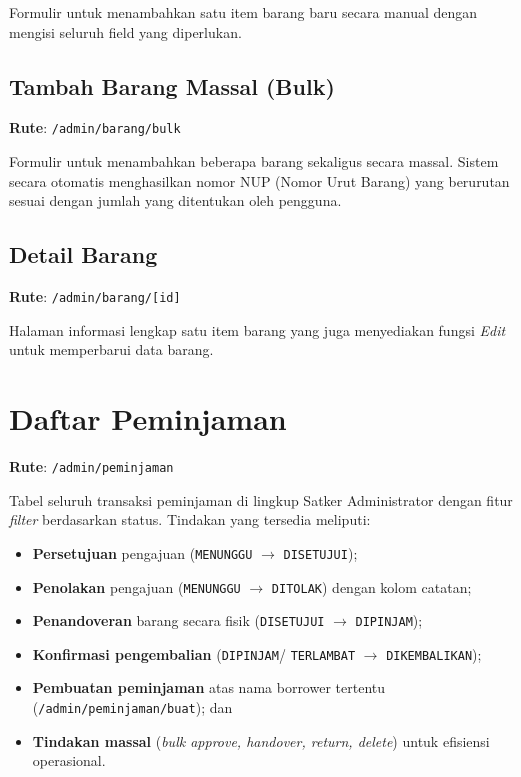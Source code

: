 \documentclass[
  12pt,
  a4paper,
  oneside,
  final
]{report}
\begin{document}
Formulir untuk menambahkan satu item barang baru secara manual
dengan mengisi seluruh field yang diperlukan.

\subsection{Tambah Barang Massal (Bulk)}
\textbf{Rute}: \texttt{/admin/barang/bulk}

Formulir untuk menambahkan beberapa barang sekaligus secara massal.
Sistem secara otomatis menghasilkan nomor NUP (Nomor Urut Barang)
yang berurutan sesuai dengan jumlah yang ditentukan oleh pengguna.

\subsection{Detail Barang}
\textbf{Rute}: \texttt{/admin/barang/[id]}

Halaman informasi lengkap satu item barang yang juga menyediakan
fungsi {\it Edit} untuk memperbarui data barang.

\section{Daftar Peminjaman}
\textbf{Rute}: \texttt{/admin/peminjaman}

Tabel seluruh transaksi peminjaman di lingkup Satker Administrator
dengan fitur {\it filter} berdasarkan status. Tindakan yang tersedia
meliputi:
\begin{itemize}
  \item {\bfseries Persetujuan} pengajuan (\texttt{MENUNGGU} $\rightarrow$
        \texttt{DISETUJUI});
  \item {\bfseries Penolakan} pengajuan (\texttt{MENUNGGU} $\rightarrow$
        \texttt{DITOLAK}) dengan kolom catatan;
  \item {\bfseries Penandoveran} barang secara fisik (\texttt{DISETUJUI}
        $\rightarrow$ \texttt{DIPINJAM});
  \item {\bfseries Konfirmasi pengembalian} (\texttt{DIPINJAM}/
        \texttt{TERLAMBAT} $\rightarrow$ \texttt{DIKEMBALIKAN});
  \item {\bfseries Pembuatan peminjaman} atas nama borrower tertentu
        (\texttt{/admin/peminjaman/buat}); dan
  \item {\bfseries Tindakan massal} ({\it bulk approve, handover, return,
        delete}) untuk efisiensi operasional.
\end{itemize}
\end{document}
